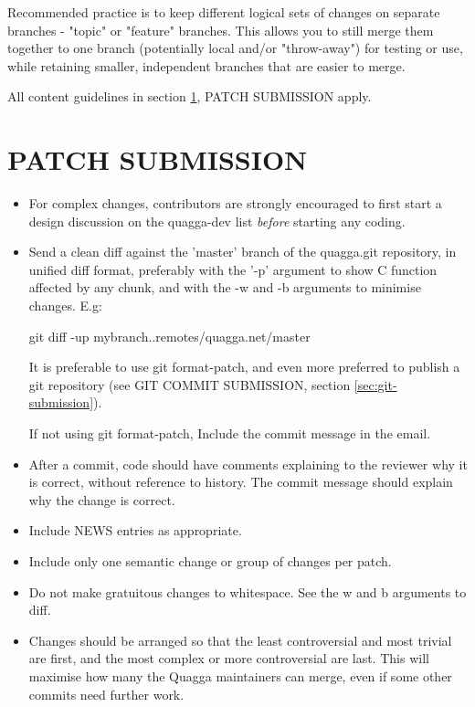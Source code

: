 \documentclass[oneside]{article}
\begin{document}
Recommended practice is to keep different logical sets of changes on
separate branches - "topic" or "feature" branches.  This allows you to still
merge them together to one branch (potentially local and/or "throw-away")
for testing or use, while retaining smaller, independent branches that are
easier to merge.

All content guidelines in section \ref{sec:patch-submission}, PATCH
SUBMISSION apply.


\section{PATCH SUBMISSION}
\label{sec:patch-submission}

\begin{itemize}

\item For complex changes, contributors are strongly encouraged to first
      start a design discussion on the quagga-dev list \emph{before}
      starting any coding.

\item Send a clean diff against the 'master' branch of the quagga.git
      repository, in unified diff format, preferably with the '-p' argument to
      show C function affected by any chunk, and with the -w and -b arguments to
      minimise changes. E.g:

     git diff -up mybranch..remotes/quagga.net/master

     It is preferable to use git format-patch, and even more preferred to
     publish a git repository (see GIT COMMIT SUBMISSION, section
     \ref{sec:git-submission}).

     If not using git format-patch, Include the commit message in the email.

\item After a commit, code should have comments explaining to the reviewer
      why it is correct, without reference to history.  The commit message
      should explain why the change is correct.

\item Include NEWS entries as appropriate.

\item Include only one semantic change or group of changes per patch.

\item Do not make gratuitous changes to whitespace. See the w and b arguments
      to diff.

\item Changes should be arranged so that the least controversial and most
      trivial are first, and the most complex or more controversial are
      last.  This will maximise how many the Quagga maintainers can merge,
      even if some other commits need further work.


\end{itemize}
\end{document}
